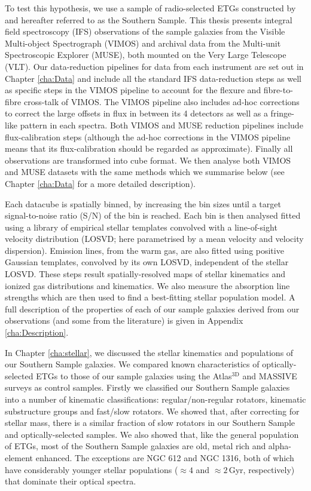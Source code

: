 To test this hypothesis, we use a sample of radio-selected ETGs constructed by \citet{Prandoni2010} and hereafter referred to as the Southern Sample. This thesis presents integral field spectroscopy (IFS) observations of the sample galaxies from the Visible Multi-object Spectrograph (VIMOS)  and archival data from the Multi-unit Spectroscopic Explorer (MUSE), both mounted on the Very Large Telescope (VLT). Our data-reduction pipelines for data from each instrument are set out in Chapter \ref{cha:Data} and include all the standard IFS data-reduction steps as well as specific steps in the VIMOS pipeline to account for the flexure and fibre-to-fibre cross-talk of VIMOS. The VIMOS pipeline also includes ad-hoc corrections to correct the large offsets in flux in between its 4 detectors as well as a fringe-like pattern in each spectra. Both VIMOS and MUSE reduction pipelines include flux-calibration steps (although the ad-hoc corrections in the VIMOS pipeline means that its flux-calibration should be regarded as approximate). Finally all observations are transformed into cube format. We then analyse both VIMOS and MUSE datasets with the same methods which we summarise below (see Chapter \ref{cha:Data} for a more detailed description). 

Each datacube is spatially binned, by increasing the bin sizes until a target signal-to-noise ratio (S/N) of the bin is reached. Each bin is then analysed fitted using a library of empirical stellar templates convolved with a line-of-sight velocity distribution (LOSVD; here parametrised by a mean velocity and velocity dispersion). Emission lines, from the warm gas, are also fitted using positive Gaussian templates, convolved by its own LOSVD, independent of the stellar LOSVD. These steps result spatially-resolved maps of stellar kinematics and ionized gas distributions and kinematics. We also measure the absorption line strengths which are then used to find a best-fitting stellar population model. A full description of the properties of each of our sample galaxies derived from our observations (and some from the literature) is given in Appendix \ref{cha:Description}. 

In Chapter \ref{cha:stellar}, we discussed the stellar kinematics and populations of our Southern Sample galaxies. We compared known characteristics of optically-selected ETGs to those of our sample galaxies using the Atlas$^\text{3D}$ and MASSIVE surveys as control samples. Firstly we classified our Southern Sample galaxies into a number of kinematic classifications: regular/non-regular rotators, kinematic substructure groups and fast/slow rotators. We showed that, after correcting for stellar mass, there is a similar fraction of slow rotators in our Southern Sample and optically-selected samples. We also showed that, like the general population of ETGs, most of the Southern Sample galaxies are old, metal rich and alpha-element enhanced. The exceptions are NGC 612 and NGC 1316, both of which have considerably younger stellar populations ($\approx 4$ and $\approx 2$\,Gyr, respectively) that dominate their optical spectra. 

